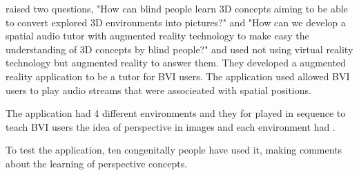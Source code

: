  raised two questions, "How can blind people learn 3D concepts aiming to be able to convert explored 3D environments into pictures?" and "How can we develop a spatial audio tutor with augmented reality technology to make easy the understanding of 3D concepts by blind people?" and used not using virtual reality technology but augmented reality to answer them. They developed a augmented reality application to be a tutor for BVI users. The application used allowed BVI users to play audio streams that were associeated with spatial positions.

The application had 4 different environments and they for played in sequence to teach BVI users the idea of perspective in images and each environment had .

To test the application, ten congenitally people have used it, making comments about the learning of perspective concepts.

